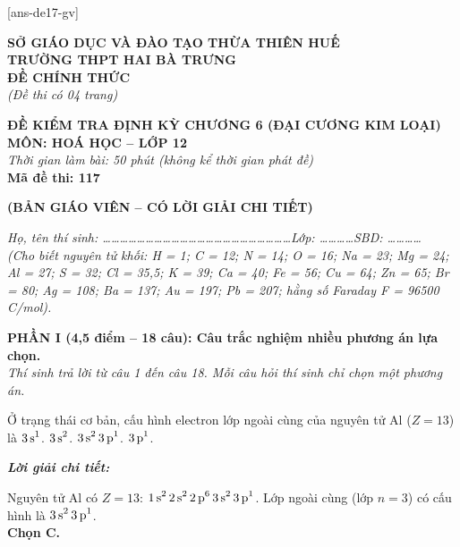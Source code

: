 \documentclass[11pt,a4paper]{article}
\def\loigiai#1{
\par\begingroup\color{blue!80!black}\small
\noindent\textbf{\textit{Lời giải chi tiết:}}\par
#1\par\endgroup}
\begin{document}
[ans-de17-gv]

\noindent
\begin{minipage}[t]{0.48\textwidth}
	\textbf{SỞ GIÁO DỤC VÀ ĐÀO TẠO THỪA THIÊN HUẾ}\\
	\textbf{TRƯỜNG THPT HAI BÀ TRƯNG}\\
	\textbf{ĐỀ CHÍNH THỨC}\\
	\textit{(Đề thi có 04 trang)}
\end{minipage}\hfill
\begin{minipage}[t]{0.48\textwidth}
	\raggedleft
	\textbf{\color{mainGreen}ĐỀ KIỂM TRA ĐỊNH KỲ CHƯƠNG 6 (ĐẠI CƯƠNG KIM LOẠI)}\\
	\textbf{MÔN: HOÁ HỌC -- LỚP 12}\\
	\textit{Thời gian làm bài: 50 phút (không kể thời gian phát đề)}\\
	\textbf{Mã đề thi: 117}
\end{minipage}


\vspace{0.1cm}
\begin{center}
	\textbf{\color{hfRed}\Large (BẢN GIÁO VIÊN -- CÓ LỜI GIẢI CHI TIẾT)}
\end{center}

\vspace{1pt}
\noindent\textit{Họ, tên thí sinh: \dots\dots\dots\dots\dots\dots\dots\dots\dots\dots\dots\dots\dots\dots\dots\dots\dots\dots\dots\dots\dots\dots Lớp: \dots\dots\dots\dots SBD: \dots\dots\dots\dots}\\
\noindent\textit{(Cho biết nguyên tử khối: H = 1; C = 12; N = 14; O = 16; Na = 23; Mg = 24; Al = 27; S = 32; Cl = 35,5; K = 39; Ca = 40; Fe = 56; Cu = 64; Zn = 65; Br = 80; Ag = 108; Ba = 137; Au = 197; Pb = 207; hằng số Faraday F = 96500 C/mol).}

\vspace{2pt}
\noindent
\textbf{PHẦN I (4,5 điểm -- 18 câu): Câu trắc nghiệm nhiều phương án lựa chọn.}\\
\textit{Thí sinh trả lời từ câu 1 đến câu 18. Mỗi câu hỏi thí sinh chỉ chọn một phương án.}

\setcounter{ex}{0}

\begin{ex}
Ở trạng thái cơ bản, cấu hình electron lớp ngoài cùng của nguyên tử Al ($Z = 13$) là
\choice
{$\ce{3s^1}$.}
{$\ce{3s^2}$.}
{\True $\ce{3s^2 3p^1}$.}
{$\ce{3p^1}$.}
\loigiai{
Nguyên tử Al có $Z = 13$: $\ce{1s^2 2s^2 2p^6 3s^2 3p^1}$. Lớp ngoài cùng (lớp $n = 3$) có cấu hình là $\ce{3s^2 3p^1}$.\\
\textbf{Chọn C.}}
\end{ex}
\end{document}
